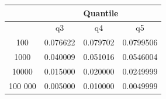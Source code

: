 \documentclass{article}
\begin{document}
\begin{center}
    \begin{tabular}{|c|c|c|c|}
        \hline
                & \multicolumn{3}{c|}{Quantile}                        \\
        \hline
                & q3                           & q4       & q5        \\
        \hline
        100     & 0.076622                     & 0.079702 & 0.0799506 \\
        1000    & 0.040009                     & 0.051016 & 0.0546004 \\
        10000   & 0.015000                     & 0.020000 & 0.0249999 \\
        100 000 & 0.005000                     & 0.010000 & 0.0049999 \\
        \hline
    \end{tabular}
\end{center}
\end{document}

